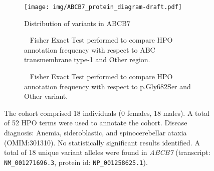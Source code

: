\begin{figure}[htbp]
\centering
\begin{subfigure}[b]{0.95\textwidth}
\centering
\texttt{[image:  img/ABCB7\_protein\_diagram-draft.pdf]} 
\captionsetup{justification=raggedright,singlelinecheck=false}
\caption{Distribution of variants in ABCB7}
\end{subfigure}

\vspace{2em}

\begin{subfigure}[b]{0.95\textwidth}
\centering
{}
\captionsetup{justification=raggedright,singlelinecheck=false}
\caption{         Fisher Exact Test performed to compare HPO annotation frequency with respect to ABC transmembrane type-1 and Other region. }
\end{subfigure}

\vspace{2em}

\begin{subfigure}[b]{0.95\textwidth}
\centering
{}
\captionsetup{justification=raggedright,singlelinecheck=false}
\caption{         Fisher Exact Test performed to compare HPO annotation frequency with respect to p.Gly682Ser and Other variant. }
\end{subfigure}

\vspace{2em}

\caption{ The cohort comprised 18 individuals (0 females, 18 males). A total of 52 HPO terms were used to annotate the cohort. Disease diagnosis: Anemia, sideroblastic, and spinocerebellar ataxia (OMIM:301310). No statistically significant results identified. A total of 18 unique variant alleles were found in \textit{ABCB7} (transcript: \texttt{NM\_001271696.3}, protein id: \texttt{NP\_001258625.1}).}
\end{figure}
